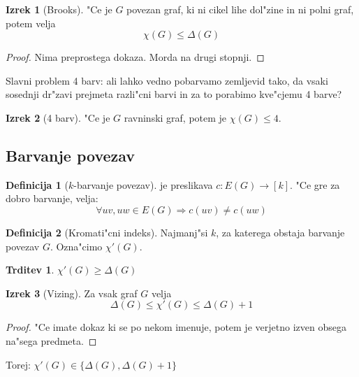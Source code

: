 \documentclass{article}
\theoremstyle{definition}
\newtheorem{definition}{Definicija}[section]
\newtheorem{claim}{Trditev}[section]
\newtheorem{theorem}{Izrek}[section]
\begin{document}
	\begin{theorem}[Brooks]
		"Ce je $G$ povezan graf, ki ni cikel lihe dol"zine in ni polni graf, potem velja 
		$$\chi(G) \leq \Delta(G)$$
		\begin{proof}
			Nima preprostega dokaza. Morda na drugi stopnji.
		\end{proof}
	\end{theorem}
	
	Slavni problem 4 barv: ali lahko vedno pobarvamo zemljevid tako, da vsaki sosednji dr"zavi prejmeta razli"cni barvi in za to porabimo kve"cjemu 4 barve?
	
	
	\begin{theorem}[4 barv]
		"Ce je $G$ ravninski graf, potem je $\chi(G) \leq 4$.
	\end{theorem}
	
	\subsection{Barvanje povezav}
	\begin{definition}[$k$-barvanje povezav]
		je preslikava $c: E(G) \rightarrow [k]$. "Ce gre za dobro barvanje, velja:
		$$ \forall uv, uw \in E(G) \Rightarrow c(uv) \neq c(uw) $$
	\end{definition}
	\begin{definition}[Kromati"cni indeks]
		Najmanj"si $k$, za katerega obstaja barvanje povezav $G$. Ozna"cimo $\chi'(G)$.
	\end{definition}

	\begin{claim}
		$\chi'(G) \geq \Delta(G)$
	\end{claim}

	\begin{theorem}[Vizing]
		Za vsak graf $G$ velja $$ \Delta(G) \leq \chi'(G) \leq \Delta(G)+1 $$
		\begin{proof}
			"Ce imate dokaz ki se po nekom imenuje, potem je verjetno izven obsega na"sega predmeta.
		\end{proof}
	\end{theorem}
	Torej: $\chi'(G) \in \lbrace \Delta(G), \Delta(G)+1 \rbrace$
	
\end{document}
